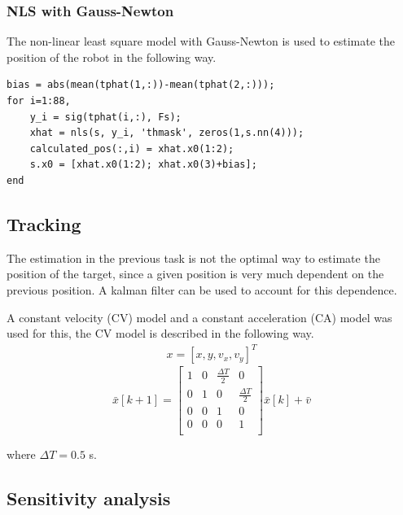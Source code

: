 \documentclass[11pt]{article}
\begin{document}
\subsubsection{NLS with Gauss-Newton}
The non-linear least square model with Gauss-Newton is used to estimate the position of the robot in the following way.

\begin{verbatim}
bias = abs(mean(tphat(1,:))-mean(tphat(2,:)));
for i=1:88,
    y_i = sig(tphat(i,:), Fs);
    xhat = nls(s, y_i, 'thmask', zeros(1,s.nn(4)));
    calculated_pos(:,i) = xhat.x0(1:2);
    s.x0 = [xhat.x0(1:2); xhat.x0(3)+bias];
end
\end{verbatim}


\subsection{Tracking}
The estimation in the previous task is not the optimal way to estimate the position of the target, since a given position is very much dependent on the previous position. A kalman filter can be used to account for this dependence.

A constant velocity (CV) model and a constant acceleration (CA) model was used for this, the CV model is described in the following way.
\begin{align*}
x = [x, y, v_x, v_y]^T
\end{align*}
\[
  \bar{x}[k+1] = 
  \begin{bmatrix}
    1 & 0 & \frac{\Delta T}{2} & 0 \\
    0 & 1 & 0 & \frac{\Delta T}{2} \\
    0 & 0 & 1 & 0 \\
    0 & 0 & 0 & 1 \\
  \end{bmatrix}
  \bar{x}[k] + \bar{v}
\]

where $\Delta T = 0.5$ s.

\subsection{Sensitivity analysis}
\end{document}
